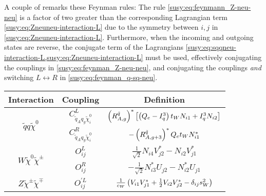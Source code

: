 \documentclass[../main.tex]{subfiles}
\begin{document}
A couple of remarks these Feynman rules:
The rule \cref{susy:eq:feynmann_Z-neu-neu} is a factor of two greater than the corresponding Lagrangian term \cref{susy:eq:Zneuneu-interaction-L} due to the symmetry between \(i, j\) in \cref{susy:eq:Zneuneu-interaction-L}.
Furthermore, when the incoming and outgoing states are reverse, the conjugate term of the Lagrangians \cref{susy:eq:sqqneu-interaction-L,susy:eq:Zneuneu-interaction-L} must be used, effectively conjugating the couplings in \cref{susy:eq:feynman_Z-neu-neu}, and conjugating the couplings \emph{and} switching \(L \leftrightarrow R\) in \cref{susy:eq:feynman_q-sq-neu}.
{\renewcommand{\arraystretch}{2}
\begin{table}[ht!]
  \centering
  \begin{tabular}{|c|c|c|}
    \hline
    Interaction                                            & Coupling                                            & Definition
    \\
    \hline
    \multirow{2}{*}{\(\tilde{q} q \tilde\chi^0\)}          & \(C_{\tilde{q}_A q_g \tilde{\chi}_i^0}^{L}\)        & \(\left(R^{\tilde{q}}_{A,g}\right)^\ast \left[\left(Q_e-I^3_q\right) t_W N_{i1} + I^3_q N_{i2}\right]\)                                                                                             \\
                                                           & \(C_{\tilde{q}_A q_g \tilde{\chi}_i^0}^{R}\)        & \(-\left(R^{\tilde{q}}_{A,g+3}\right)^\ast Q_e t_W N_{i1}^\ast\)                                                                                                                              \\
    \hline
    \multirow{2}{*}{\(W \tilde\chi^0 \tilde\chi^\pm\)}     & \(O_{ij}^L\)                                        & \(\frac{1}{\sqrt{2}} N_{i4} V_{j2}^\ast - N_{i2}V_{j1}^\ast\)                                                                                                                              \\
                                                           & \(O_{ij}^R\)                                        & \(-\frac{1}{\sqrt{2}} N_{i3}^\ast U_{j2} - N_{i2}^\ast U_{j1}\)                                                                                                                            \\
    \hline
    \multirow{2}{*}{\(Z \tilde\chi^\pm \tilde\chi^\mp\)}   & \(O_{ij}^{\prime L}\)                               & \(\frac{1}{c_W} \left(V_{i1} V_{j1}^\ast + \frac{1}{2} V_{i2}V_{j2}^\ast - \delta_{ij} s_W^2\right)\)                                                                                         \\

\end{tabular}
\end{table}}
\end{document}
